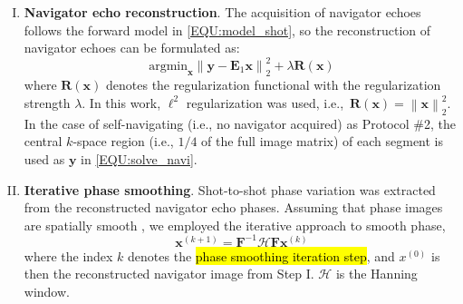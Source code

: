 \documentclass[preprint,12pt,authoryear,review]{elsarticle}
\begin{document}
    \begin{enumerate}[I.]
        \item \textbf{Navigator echo reconstruction}.
        The acquisition of navigator echoes follows the forward model
        in \cref{EQU:model_shot}, so the reconstruction of navigator echoes
        can be formulated as:
        \begin{equation}
            \mathrm{argmin}_\mathbf{x} \left\| \mathbf{y} - \mathbf{E}_1 \mathbf{x} \right\|_2^2
            + \lambda \mathbf{R}(\mathbf{x})
            \label{EQU:solve_navi}
        \end{equation}
    	where $\mathbf{R}(\mathbf{x})$ denotes the regularization functional
    	with the regularization strength $\lambda$.
    	In this work, $\ell^2$ regularization was used,
    	i.e.,~$\mathbf{R}(\mathbf{x}) = \left\lVert \mathbf{x} \right\rVert_2^2$.
        In the case of self-navigating
        (i.e., no navigator acquired) as Protocol \#2,
        the central $k$-space region (i.e., $1/4$ of the full image matrix)
        of each segment is used as $\mathbf{y}$ in \cref{EQU:solve_navi}.

        \item \textbf{Iterative phase smoothing}.
        Shot-to-shot phase variation was extracted from
        the reconstructed navigator echo phases.
        Assuming that phase images are spatially smooth
        \citep{chen_2013_muse,dai_2023_julep},
        we employed the iterative approach to smooth phase,
        \begin{equation}
        	\mathbf{x}^{(k+1)} = \mathbf{F}^{-1} \mathcal{H} \mathbf{F} \mathbf{x}^{(k)}
        	\label{EQU:ITER_PHASE}
        \end{equation}
    	where the index $k$ denotes
        the \hl{phase smoothing iteration step},
    	and $x^{(0)}$ is then the reconstructed navigator image from Step I.
    	$\mathcal{H}$ is the Hanning window.


\end{enumerate}
\end{document}
